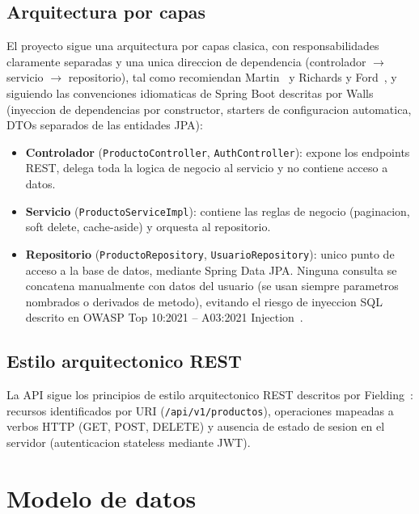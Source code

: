 \documentclass[11pt,a4paper]{article}
\begin{document}
\subsection{Arquitectura por capas}

El proyecto sigue una arquitectura por capas clasica, con responsabilidades
claramente separadas y una unica direccion de dependencia (controlador
$\rightarrow$ servicio $\rightarrow$ repositorio), tal como recomiendan
Martin~\cite{martin2017} y Richards y Ford~\cite{richards2020}, y
siguiendo las convenciones idiomaticas de Spring Boot descritas por
Walls~\cite{walls2022} (inyeccion de dependencias por constructor,
starters de configuracion automatica, DTOs separados de las entidades
JPA):

\begin{itemize}
    \item \textbf{Controlador} (\texttt{ProductoController}, \texttt{AuthController}):
          expone los endpoints REST, delega toda la logica de negocio al
          servicio y no contiene acceso a datos.
    \item \textbf{Servicio} (\texttt{ProductoServiceImpl}): contiene las
          reglas de negocio (paginacion, soft delete, cache-aside) y
          orquesta al repositorio.
    \item \textbf{Repositorio} (\texttt{ProductoRepository},
          \texttt{UsuarioRepository}): unico punto de acceso a la base de
          datos, mediante Spring Data JPA. Ninguna consulta se concatena
          manualmente con datos del usuario (se usan siempre parametros
          nombrados o derivados de metodo), evitando el riesgo de inyeccion
          SQL descrito en OWASP Top 10:2021 -- A03:2021 Injection~\cite{owasp2021}.
\end{itemize}

\subsection{Estilo arquitectonico REST}

La API sigue los principios de estilo arquitectonico REST descritos por
Fielding~\cite{fielding2000}: recursos identificados por URI
(\texttt{/api/v1/productos}), operaciones mapeadas a verbos HTTP (GET,
POST, DELETE) y ausencia de estado de sesion en el servidor (autenticacion
stateless mediante JWT).

\section{Modelo de datos}
\end{document}
